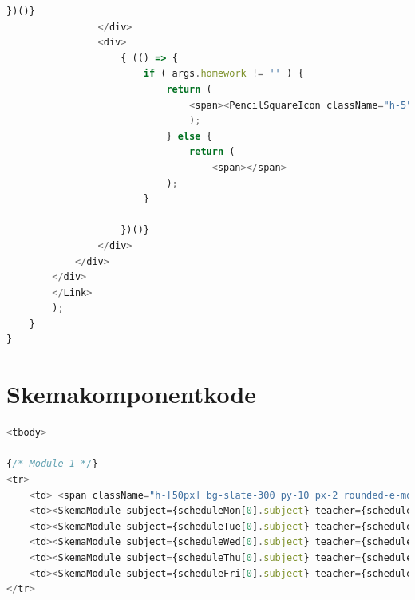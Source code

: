 \documentclass[12pt, a4paper]{article}
\begin{document}
\begin{appendices}
\begin{lstlisting}[language=Javascript]
                            })()}
                </div>
                <div>
                    { (() => {
                        if ( args.homework != '' ) {
                            return (
                                <span><PencilSquareIcon className="h-5"/></span>
                                );
                            } else {
                                return (
                                    <span></span>
                            );
                        }
                        
                    })()}
                </div>
            </div>
        </div>
        </Link>
        );
    }
}
        \end{lstlisting} \newpage
        \section{Skemakomponentkode \label{appendix:SkemaModule}} \newpage
        \renewcommand*{\thepage}{D\arabic{page}}
        \begin{lstlisting}[language=Javascript]
<tbody>
                
{/* Module 1 */}
<tr>
    <td> <span className="h-[50px] bg-slate-300 py-10 px-2 rounded-e-md text-slate-600 font-bold">1.</span> </td>
    <td><SkemaModule subject={scheduleMon[0].subject} teacher={scheduleMon[0].teacher} room={scheduleMon[0].room} visibility={scheduleMon[0].visibility} note={scheduleMon[0].note} homework={scheduleMon[0].homework} id={scheduleMon[0].id}/></td>
    <td><SkemaModule subject={scheduleTue[0].subject} teacher={scheduleTue[0].teacher} room={scheduleMon[0].room} visibility={scheduleTue[0].visibility} note={scheduleTue[0].note} homework={scheduleTue[0].homework} id={scheduleTue[0].id}/></td>
    <td><SkemaModule subject={scheduleWed[0].subject} teacher={scheduleWed[0].teacher} room={scheduleWed[0].room} visibility={scheduleWed[0].visibility} note={scheduleWed[0].note} homework={scheduleWed[0].homework} id={scheduleWed[0].id}/></td>
    <td><SkemaModule subject={scheduleThu[0].subject} teacher={scheduleThu[0].teacher} room={scheduleThu[0].room} visibility={scheduleThu[0].visibility} note={scheduleThu[0].note} homework={scheduleThu[0].homework} id={scheduleThu[0].id}/></td>
    <td><SkemaModule subject={scheduleFri[0].subject} teacher={scheduleFri[0].teacher} room={scheduleFri[0].room} visibility={scheduleFri[0].visibility} note={scheduleFri[0].note} homework={scheduleFri[0].homework} id={scheduleFri[0].id}/></td>
</tr>


\end{lstlisting}
\end{appendices}
\end{document}
